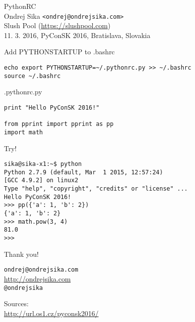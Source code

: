 \documentclass{beamer}
\begin{document}
\begin{frame}

    {\LARGE PythonRC}\\
    \vspace{7mm}
    {\Large Ondrej Sika \lstinline|<ondrej@ondrejsika.com>|}\\
    \vspace{7mm}
    {\large Slush Pool (\url{https://slushpool.com})}\\
    \vspace{7mm}
    11. 3. 2016, PyConSK 2016, Bratislava, Slovakia\\

\end{frame}

\begin{frame}[fragile]

    {\LARGE Add PYTHONSTARTUP to .bashrc}\\

    \begin{verbatim}
echo export PYTHONSTARTUP=~/.pythonrc.py >> ~/.bashrc
source ~/.bashrc
    \end{verbatim}

\end{frame}

\begin{frame}[fragile]

    {\LARGE .pythonrc.py}\\

    \begin{verbatim}
print "Hello PyConSK 2016!"

from pprint import pprint as pp
import math
    \end{verbatim}

\end{frame}

\begin{frame}[fragile]

    {\LARGE Try!}\\

    \begin{verbatim}
sika@sika-x1:~$ python
Python 2.7.9 (default, Mar  1 2015, 12:57:24)
[GCC 4.9.2] on linux2
Type "help", "copyright", "credits" or "license" ...
Hello PyConSK 2016!
>>> pp({'a': 1, 'b': 2})
{'a': 1, 'b': 2}
>>> math.pow(3, 4)
81.0
>>>
    \end{verbatim}

\end{frame}

\begin{frame}

    {\LARGE Thank you!}\\

    \vspace{1cm}

    \texttt{ondrej@ondrejsika.com}\\
    \url{http://ondrejsika.com}\\
    \texttt{@ondrejsika}\\

    \vspace{1cm}

    Sources:\\
    \url{http://url.os1.cz/pyconsk2016/}
\end{frame}
\end{document}
